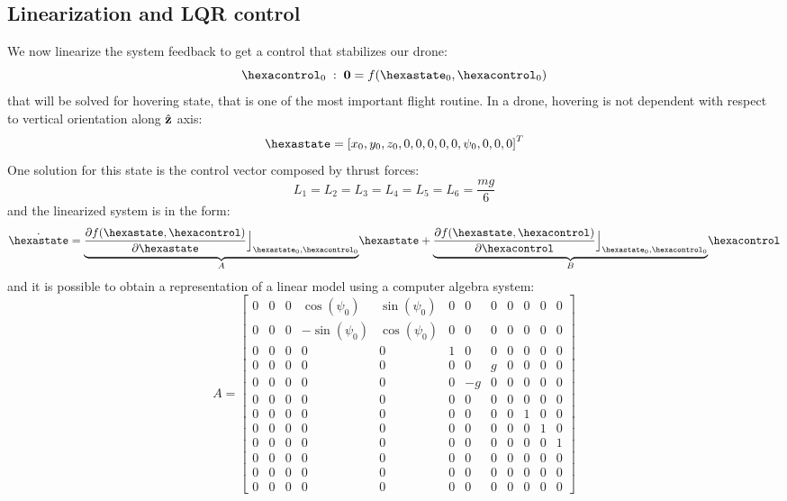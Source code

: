 \subsection{Linearization and LQR control}
We now linearize the system feedback to get a control that stabilizes our drone:
\begin{equation}
\hexacontrol_0 \; : \; \mathbf{0}=f(\hexastate_0, \hexacontrol_0)
\end{equation}
that will be solved for hovering state, that is one of the most important flight routine. In a drone, hovering is not dependent with respect to vertical orientation along $\hat{\mathbf{z}}$ axis:
\[
\hexastate = \left[ x_0, y_0, z_0,0,0,0,0,0,\psi_0,0,0,0 \right]^T
\]
One solution for this state is the control vector composed by thrust forces:
\[
L_1 = L_2 = L_3 = L_4 = L_5 = L_6 = \dfrac{mg}{6}
\]
and the linearized system is in the form:
\begin{equation}
\dot{\hexastate} = \underset{A}{\underbrace{\dfrac{\partial f(\hexastate,\hexacontrol)}{\partial \hexastate} \Big\rfloor_{\hexastate_0,\hexacontrol_0}}} \hexastate + \underset{B}{\underbrace{\dfrac{\partial f(\hexastate,\hexacontrol)}{\partial \hexacontrol} \Big\rfloor_{\hexastate_0,\hexacontrol_0}}} \hexacontrol
\end{equation}
and it is possible to obtain a representation of a linear model using a computer algebra system:
\renewcommand{\arraystretch}{1}
\begin{equation}
A = \left[ \begin{array}{cccccccccccc} 0&0&0&\cos \left( \psi_{{0}}
 \right) &\sin \left( \psi_{{0}} \right) &0&0&0&0&0&0&0
\\  0&0&0&-\sin \left( \psi_{{0}} \right) &\cos
 \left( \psi_{{0}} \right) &0&0&0&0&0&0&0\\  0&0&0&0&0
&1&0&0&0&0&0&0\\  0&0&0&0&0&0&0&g&0&0&0&0
\\  0&0&0&0&0&0&-g&0&0&0&0&0\\  0&0&0
&0&0&0&0&0&0&0&0&0\\  0&0&0&0&0&0&0&0&0&1&0&0
\\  0&0&0&0&0&0&0&0&0&0&1&0\\  0&0&0
&0&0&0&0&0&0&0&0&1\\  0&0&0&0&0&0&0&0&0&0&0&0
\\  0&0&0&0&0&0&0&0&0&0&0&0\\  0&0&0
&0&0&0&0&0&0&0&0&0\end{array} \right]
\end{equation}
